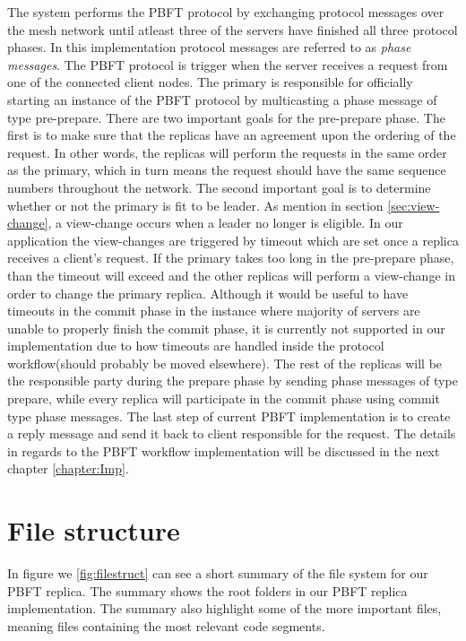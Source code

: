 The system performs the PBFT protocol by exchanging protocol messages over the mesh network until atleast three of the servers have finished all three protocol phases. In this implementation protocol messages are referred to as \emph{phase messages}. The PBFT protocol is trigger when the server receives a request from one of the connected client nodes. The primary is responsible for officially starting an instance of the PBFT protocol by multicasting a phase message of type pre-prepare. There are two important goals for the pre-prepare phase. The first is to make sure that the replicas have an agreement upon the ordering of the request. In other words, the replicas will perform the requests in the same order as the primary, which in turn means the request should have the same sequence numbers throughout the network. The second important goal is to determine whether or not the primary is fit to be leader. As mention in section \autoref{sec:view-change}, a view-change occurs when a leader no longer is eligible. In our application the view-changes are triggered by timeout which are set once a replica receives a client's request. If the primary takes too long in the pre-prepare phase, than the timeout will exceed and the other replicas will perform a view-change in order to change the primary replica. Although it would be useful to have timeouts in the commit phase in the instance where majority of servers are unable to properly finish the commit phase, it is currently not supported in our implementation due to how timeouts are handled inside the protocol workflow(should probably be moved elsewhere). The rest of the replicas will be the responsible party during the prepare phase by sending phase messages of type prepare, while every replica will participate in the commit phase using commit type phase messages. The last step of current PBFT implementation is to create a reply message and send it back to client responsible for the request. The details in regards to the PBFT workflow implementation will be discussed in the next chapter \autoref{chapter:Imp}.

\section{File structure}
In figure we \autoref{fig:filestruct} can see a short summary of the file system for our PBFT replica. The summary shows the root folders in our PBFT replica implementation. The summary also highlight some of the more important files, meaning files containing the most relevant code segments. 


